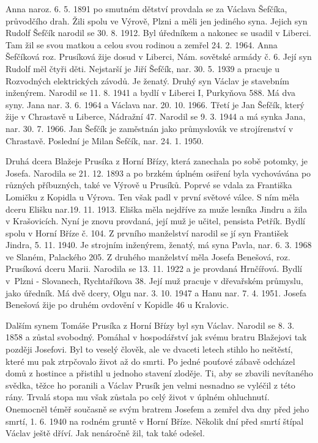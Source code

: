 \documentclass[../dejiny-rodu-prusiku.tex]{subfiles}
\begin{document}
Anna naroz. 6. 5. 1891 po smutném dětství provdala se za Václava Šefčíka, průvodčího drah. Žili spolu ve Výrově, Plzni a měli jen jediného syna. Jejich syn Rudolf Šefčík narodil se 30. 8. 1912. Byl úředníkem a nakonec se usadil v Liberci. Tam žil se svou matkou a celou svou rodinou a zemřel 24. 2. 1964. Anna Šefčíková roz. Prusíková žije dosud v Liberci, Nám. sovětské armády č. 6. Její syn Rudolf měl čtyři děti. Nejstarší je Jiří Šefčík,  nar. 30. 5. 1939 a pracuje u Rozvodných elektrických závodů. Je ženatý.  Druhý syn Václav je stavebním inženýrem. Narodil se 11. 8. 1941 a bydlí v Liberci I, Purkyňova 588. Má dva syny. Jana nar. 3. 6. 1964 a Václava nar. 20. 10. 1966. Třetí je Jan Šefčík, který žije v Chrastavě u Liberce, Nádražní 47. Narodil se 9. 3. 1944 a má synka Jana, nar. 30. 7. 1966. Jan Šefčík je zaměstnán jako průmyslovák ve strojírenství v Chrastavě. Poslední je Milan Šefčík, nar. 24. 1. 1950.

Druhá dcera Blažeje Prusíka z Horní Břízy, která zanechala po sobě potomky, je Josefa. Narodila se 21. 12. 1893 a po brzkém úplném osiření byla vychovávána po různých příbuzných, také ve Výrově u Prusíků. Poprvé se vdala za Františka Lomičku z Kopidla u Výrova. Ten však padl v první světové válce. S ním měla dceru Elišku nar.19. 11. 1913. Eliška měla nejdříve za muže lesníka Jindru a žila v Krašovicích. Nyní je znovu provdaná, její muž je učitel, pensista Petřík. Bydlí spolu v Horní Bříze č. 104. Z prvního manželství narodil se jí syn František Jindra, 5. 11.
1940. Je strojním inženýrem, ženatý, má syna Pavla, nar. 6. 3. 1968 ve Slaném, Palackého 205. Z druhého man­želství měla Josefa Benešová, roz. Prusíková dceru Marii. Narodila se 13. 11. 1922 a je provdaná Hrnčířová. Bydlí v Plzni - Slovanech, Rychtaříkova 38. Její muž pracuje v dřevařském průmyslu, jako úředník. Má dvě  dcery, Olgu nar. 3. 10. 1947 a Hanu nar. 7. 4. 1951. Josefa Benešová žije po druhém ovdovění v Kopidle 46 u Kralovic.

Dalším synem Tomáše Prusíka z Horní Břízy byl syn Václav. Narodil se 8. 3. 1858 a zůstal svobodný. Pomáhal v hospodářství jak svému bratru Blažejovi tak později Josefovi. Byl to veselý člověk, ale ve dvaceti letech stihlo ho neštěstí, které mu pak ztrpčovalo život až do smrti. Po jedné pouťové zábavě odcházel domů z hostince a přistihl u jednoho stavení zloděje. Ti, aby se zbavili nevítaného svědka, těžce ho poranili a Václav Prusík jen velmi nesnadno se vyléčil z této rány. Trvalá stopa mu však zůstala po celý život v úplném ohluchnutí. Onemocněl téměř současně se svým bratrem Josefem a zemřel dva dny před jeho smrtí, 1. 6. 1940 na rodném gruntě v Horní Bříze. Několik dní před smrtí štípal Václav ještě dříví. Jak nenáročně žil, tak také odešel. ­
\end{document}
